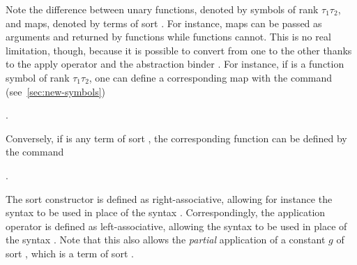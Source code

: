 Note the difference between unary functions, 
denoted by symbols of rank $\tau_1\tau_2$, and maps, 
denoted by terms of sort .
For instance, maps can be passed as arguments and returned by functions
while functions cannot.
This is no real limitation, though, because it is possible to convert from one to the other
thanks to the apply operator  and the abstraction binder .
For instance, if  is a function symbol of rank $\tau_1\tau_2$,
one can define a corresponding map with the command 
(see~\ref{sec:new-symbols}) 
\begin{center}
 .
\end{center}
%
Conversely, if  is any term of sort ,
the corresponding function can be defined by the command 
\begin{center}
 .
\end{center}

The \ter{->} sort constructor is defined as right-associative, 
allowing for instance the syntax
 to be used in place of the syntax
.
Correspondingly, the application operator  is defined as left-associative, 
allowing the syntax
 to be used in place of the syntax
.
Note that this also allows the \emph{partial} application  
of a constant $g$ of sort ,
which is a term of sort .

%
%

